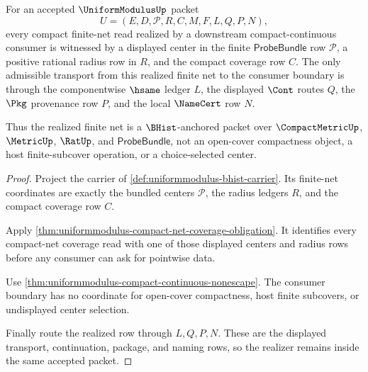 \begin{theorem}
\label{thm:uniformmodulus-finite-net-realizer-unblock}
For an accepted $\UniformModulusUp$ packet
$$
U=(E,D,\mathcal{P},R,C,M,F,L,Q,P,N),
$$
every compact finite-net read realized by a downstream compact-continuous consumer is witnessed by a displayed center in the finite $\mathsf{ProbeBundle}$ row $\mathcal{P}$, a positive rational radius row in $R$, and the compact coverage row $C$. The only admissible transport from this realized finite net to the consumer boundary is through the componentwise $\hsame$ ledger $L$, the displayed $\Cont$ routes $Q$, the $\Pkg$ provenance row $P$, and the local $\NameCert$ row $N$.

Thus the realized finite net is a $\BHist$-anchored packet over $\CompactMetricUp$, $\MetricUp$, $\RatUp$, and $\mathsf{ProbeBundle}$, not an open-cover compactness object, a host finite-subcover operation, or a choice-selected center.
\end{theorem}
\begin{proof}
Project the carrier of \autoref{def:uniformmodulus-bhist-carrier}. Its finite-net coordinates are exactly the bundled centers $\mathcal{P}$, the radius ledgers $R$, and the compact coverage row $C$.

Apply \autoref{thm:uniformmodulus-compact-net-coverage-obligation}. It identifies every compact-net coverage read with one of those displayed centers and radius rows before any consumer can ask for pointwise data.

Use \autoref{thm:uniformmodulus-compact-continuous-nonescape}. The consumer boundary has no coordinate for open-cover compactness, host finite subcovers, or undisplayed center selection.

Finally route the realized row through $L,Q,P,N$. These are the displayed transport, continuation, package, and naming rows, so the realizer remains inside the same accepted packet.
\end{proof}

